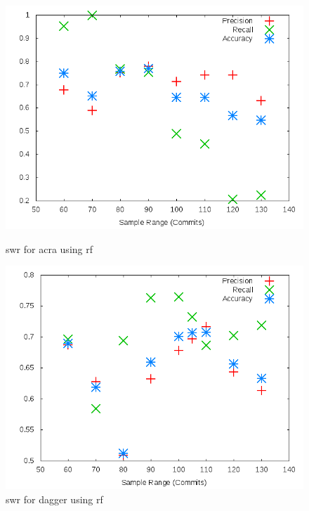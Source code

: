 \begin{figure}[h]
    \centering

    \begin{minipage}[b]{0.45\linewidth}
        \includegraphics[width=1.0\textwidth]{images/rf/test_1/acra_sample_range}
        \caption{\gls{swr} for acra using \gls{rf}}
        \label{fig:test_1_acra_rf}
    \end{minipage}
\quad
    \begin{minipage}[b]{0.45\linewidth}
        \includegraphics[width=1.0\textwidth]{images/rf/test_1/dagger_sample_range}
        \caption{\gls{swr} for dagger using \gls{rf}}
        \label{fig:test_1_dagger_rf}
    \end{minipage}
\end{figure}


